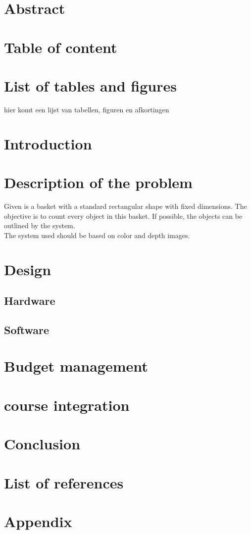 \documentclass{article}
\begin{document}
\section{Abstract}

\section{Table of content}

\section{List of tables and figures}
hier komt een lijst van tabellen, figuren en afkortingen

\section{Introduction}

\section{Description of the problem}

\hspace{\parindent} Given is a basket with a standard rectangular shape with fixed dimensions. The objective is to count every object in this basket. If possible, the objects can be outlined by the system.\\

\noindent The system used should be based on color and depth images.


\section{Design}
\subsection{Hardware}
\subsection{Software}

\section{Budget management}

\section{course integration}

\section{Conclusion}

\section{List of references}

\section{Appendix}
\end{document}
